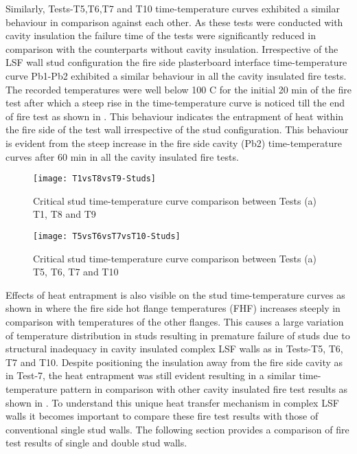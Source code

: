 Similarly, Tests-T5,T6,T7 and T10 time-temperature curves exhibited a similar behaviour in comparison against each other. As these tests were conducted with cavity insulation the failure time of the tests were significantly reduced in comparison with the counterparts without cavity insulation. Irrespective of the LSF wall stud configuration the fire side plasterboard interface time-temperature curve Pb1-Pb2 exhibited a similar behaviour in all the cavity insulated fire tests. The recorded temperatures were well below 100 \degree C for the initial 20 min of the fire test after which a steep rise in the time-temperature curve is noticed till the end of fire test as shown in . This behaviour indicates the entrapment of heat within the fire side of the test wall irrespective of the stud configuration. This behaviour is evident from the steep increase in the fire side cavity (Pb2) time-temperature curves after 60 min in all the cavity insulated fire tests.  
\begin{figure}[!htbp]
	\centering
		\texttt{[image: T1vsT8vsT9-Studs]}  
	\caption{Critical stud time-temperature curve comparison between Tests (a) T1, T8 and T9}
	\label{fig:T1vsT8vsT9-Studs}
\end{figure}
\begin{figure}[!htbp]
	\centering
		\texttt{[image: T5vsT6vsT7vsT10-Studs]}  
	\caption{Critical stud time-temperature curve comparison between Tests (a) T5, T6, T7 and T10}
	\label{fig:T5vsT6vsT7vsT10-Studs}
\end{figure} 

Effects of heat entrapment is also visible on the stud time-temperature curves as shown in  where the fire side hot flange temperatures (FHF) increases steeply in comparison with temperatures of the other flanges. This causes a large variation of temperature distribution in studs resulting in premature failure of studs due to structural inadequacy in cavity insulated complex LSF walls as in Tests-T5, T6, T7 and T10. Despite positioning the insulation away from the fire side cavity as in Test-7, the heat entrapment was still evident resulting in a similar time-temperature pattern in comparison with other cavity insulated fire test results as shown in . To understand this unique heat transfer mechanism in complex LSF walls it becomes important to compare these fire test results with those of conventional single stud walls. The following section provides a comparison of fire test results of single and double stud walls.

